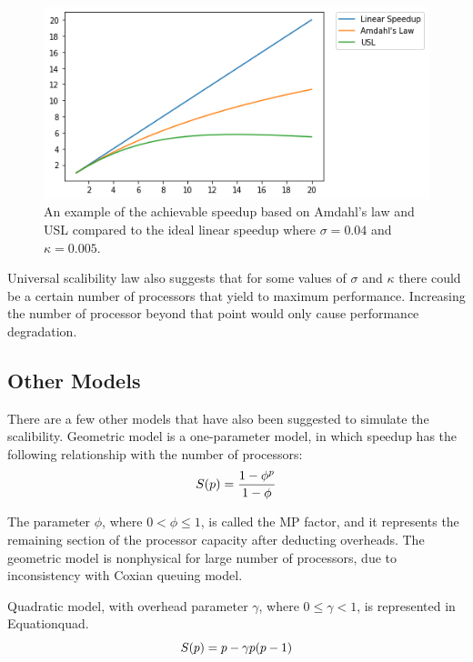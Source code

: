 \begin{figure}[H]
	\centering
	\includegraphics[scale=0.8]{images/Amdahls.png}
	\caption{An example of the achievable speedup based on Amdahl's law and USL compared to the ideal linear speedup where $\sigma=0.04$ and $\kappa=0.005$.}	
	\label{fig_Amdahl}
\end{figure}

Universal scalibility law also suggests that for some values of $\sigma$ and $\kappa$ there could be a certain number of processors that yield to maximum performance\cite{gunther2007guerrilla}. Increasing the number of processor beyond that point would only cause performance degradation.  

\vspace{\baselineskip}
\subsection{Other Models}	
There are a few other models that have also been suggested to simulate the scalibility. Geometric model is a one-parameter model, in which speedup has the following relationship with the number of processors:
\begin{equation}\label{geo}
S(p) = \frac{1-\phi^{p}}{1-\phi}\\
\end{equation}

The parameter $\phi$, where $0<\phi\leqslant1$, is called the MP factor, and it represents the remaining section of the processor capacity after deducting overheads. 
The geometric model is nonphysical for large number of processors, due to inconsistency with Coxian queuing model\cite{gunther2002new}. 

Quadratic model\cite{gunther2000practical}, with overhead parameter $\gamma$, where $0	\leqslant\gamma<1$, is represented in Equation{quad}.
\begin{equation}\label{quad}
S(p) = p-\gamma{p(p-1)}\\
\end{equation}

